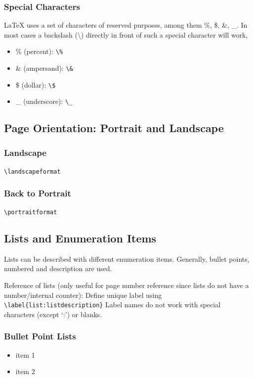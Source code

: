 \subsubsection{Special Characters}
\LaTeX{} uses a set of characters of reserved purposes, among them \%, \$, \&, \_.
In most cases a backslash (\textbackslash) directly in front of such a special
character will work, \eg
\begin{itemize}
\item \% (percent): \verb|\%|
\item \& (ampersand): \verb|\&|
   \item \$ (dollar): \verb|\$|
   \item \_ (underscore): \verb|\_|
\end{itemize}

\subsection{Page Orientation: Portrait and Landscape}
\blindtext

\landscapeformat
\subsubsection{Landscape}
\verb|\landscapeformat|

\blindtext

\blindtext

\portraitformat
\subsubsection{Back to Portrait}
\verb|\portraitformat|

\blindtext

\subsection{Lists and Enumeration Items}
Lists can be described with different enumeration items. Generally, bullet points, numbered and
description are used.

Reference of lists (only useful for page number reference since lists do not have a number/internal
counter):
Define unique label using\newline
\verb|\label{list:listdescription}| \newline
Label names do not work with special characters (except `:') or blanks.

\subsubsection{Bullet Point Lists}
\begin{itemize}
\item item 1
\item item 2
\end{itemize}

